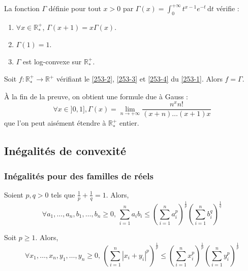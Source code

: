 	
	\begin{lemma}
		\label{253-1}
		La fonction $\Gamma$ définie pour tout $x > 0$ par $\Gamma(x) = \int_0^{+\infty} t^{x-1} e^{-t} \, \mathrm{d}t$ vérifie :
		\begin{enumerate}[label=(\roman*)]
			\item \label{253-2} $\forall x \in \mathbb{R}^+_*$, $\Gamma(x+1) = x\Gamma(x)$.
			\item \label{253-3} $\Gamma(1) = 1$.
			\item \label{253-4} $\Gamma$ est log-convexe sur $\mathbb{R}^+_*$.
		\end{enumerate}
	\end{lemma}
	
	
	\begin{theorem}
		Soit $f : \mathbb{R}^+_* \rightarrow \mathbb{R}^+$ vérifiant le \cref{253-2}, \cref{253-3} et \cref{253-4} du \cref{253-1}. Alors $f = \Gamma$.
	\end{theorem}
	
	\begin{remark}
		À la fin de la preuve, on obtient une formule due à Gauss :
		\[ \forall x \in ]0, 1], \Gamma(x) = \lim_{n \rightarrow +\infty} \frac{n^x n!}{(x+n) \dots (x+1)x} \]
		que l'on peut aisément étendre à $\mathbb{R}^+_*$ entier.
	\end{remark}
	
	\subsection{Inégalités de convexité}
	
	\subsubsection{Inégalités pour des familles de réels}
	
	
	\begin{proposition}
		Soient $p, q > 0$ tels que $\frac{1}{p} + \frac{1}{q} = 1$. Alors,
		\[ \forall a_1, \dots, a_n, b_1, \dots, b_n \geq 0, \, \sum_{i=1}^n a_i b_i \leq \left( \sum_{i=1}^n a_i^p \right)^{\frac{1}{p}} \left( \sum_{i=1}^n b_i^q \right)^{\frac{1}{q}} \]
	\end{proposition}
	
	\begin{proposition}
		Soit $p \geq 1$. Alors,
		\[ \forall x_1, \dots, x_n, y_1, \dots, y_n \geq 0, \, \left( \sum_{i=1}^n |x_i + y_i|^p \right)^{\frac{1}{p}} \leq \left( \sum_{i=1}^n x_i^p \right)^{\frac{1}{p}} \left( \sum_{i=1}^n y_i^p \right)^{\frac{1}{p}} \]
	\end{proposition}
	
